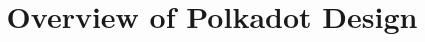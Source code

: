 \documentclass{article}
\title{Overview of Polkadot Design}
\author{}
\begin{document}
\maketitle

\begin{abstract}
\end{abstract}







\end{document}

